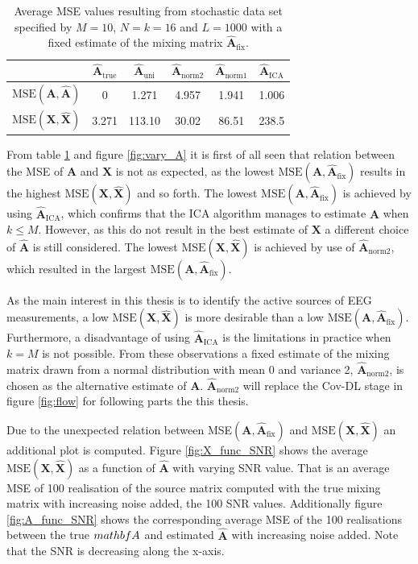 \begin{table}[H]
\centering
\begin{tabular}{|c|c|c|c|c|c|}
\hline
 &  $\hat{\mathbf{A}}_{\text{true}}$ & $\hat{\mathbf{A}}_{\text{uni}}$ & $\hat{\mathbf{A}}_{\text{norm2}}$	 & $\hat{\mathbf{A}}_{\text{norm1}}$ & $\hat{\mathbf{A}}_{\text{ICA}}$ \\
\hline
$\text{MSE}(\mathbf{A}, \hat{\mathbf{A}})$ & 0 & 1.271 & 4.957 & 1.941 & 1.006 \\
\hline
$\text{MSE}(\mathbf{X}, \hat{\mathbf{X}})$ & 3.271 & 113.10 & 30.02 & 86.51 & 238.5 \\
\hline
\end{tabular}
\caption{Average MSE values resulting from stochastic data set specified by $M=10$, $N=k=16$ and $L=1000$ with a fixed estimate of the mixing matrix $\hat{\mathbf{A}}_{\text{fix}}$.}
\label{tab:fixed}
\end{table}
\noindent
From table \ref{tab:fixed} and figure \ref{fig:vary_A} it is first of all seen that relation between the MSE of $\textbf{A}$ and $\textbf{X}$ is not as expected, as the lowest $\text{MSE}(\mathbf{A}, \hat{\mathbf{A}}_{\text{fix}})$ results in the highest $\text{MSE}(\mathbf{X}, \hat{\mathbf{X}})$ and so forth. 
The lowest $\text{MSE}(\mathbf{A}, \hat{\mathbf{A}}_{\text{fix}})$ is achieved by using $\hat{\mathbf{A}}_{\text{ICA}}$, which confirms that the ICA algorithm manages to estimate $\mathbf{A}$ when $k \leq M$. 
However, as this do not result in the best estimate of $\mathbf{X}$ a different choice of $\hat{\mathbf{A}}$ is still considered. 
The lowest $\text{MSE}(\mathbf{X}, \hat{\mathbf{X}})$ is achieved by use of $\hat{\mathbf{A}}_{\text{norm2}}$, which resulted in the largest $\text{MSE}(\mathbf{A}, \hat{\mathbf{A}}_{\text{fix}})$. 
      
As the main interest in this thesis is to identify the active sources of EEG measurements, a low $\text{MSE}(\mathbf{X}, \hat{\mathbf{X}})$ is more desirable than a low $\text{MSE}(\mathbf{A}, \hat{\mathbf{A}}_{\text{fix}})$. 
Furthermore, a disadvantage of using $\hat{\mathbf{A}}_{\text{ICA}}$ is the limitations in practice when $k = M$ is not possible. 
From these observations a fixed estimate of the mixing matrix drawn from a normal distribution with mean 0 and variance 2, $\hat{\mathbf{A}}_{\text{norm2}}$, is chosen as the alternative estimate of $\mathbf{A}$. $\hat{\mathbf{A}}_{\text{norm2}}$ will replace the Cov-DL stage in figure \ref{fig:flow} for following parts the this thesis. 

Due to the unexpected relation between MSE$(\mathbf{A}, \hat{\mathbf{A}}_{\text{fix}})$ and $\text{MSE}(\mathbf{X}, \hat{\mathbf{X}})$ an additional plot is computed. 
Figure \ref{fig:X_func_SNR} shows the average $\text{MSE}(\mathbf{X}, \hat{\mathbf{X}})$ as a function of $\hat{\textbf{A}}$ with varying SNR value. 
That is an average MSE of 100 realisation of the source matrix computed with the true mixing matrix with increasing noise added, the 100 SNR values. 
Additionally figure \ref{fig:A_func_SNR} shows the corresponding average MSE of the 100 realisations between the true $\\mathbf{A}$ and estimated $\hat{\mathbf{A}}$ with increasing noise added.
Note that the SNR is decreasing along the x-axis. 

